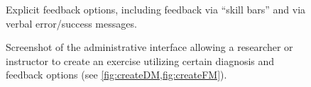 \documentclass[11pt,a4paper,onecolumn]{article}
\begin{document}
		\begin{figure}
		\centering
		\caption{Explicit feedback options, including feedback via ``skill bars'' and via verbal error/success messages.}
		\label{fig:explicitFB}
		\end{figure}
		
		\begin{figure}
		\caption{Screenshot of the administrative interface allowing a researcher or instructor to create an exercise utilizing certain diagnosis and feedback options (see \cref{fig:createDM,fig:createFM}).}
		\label{fig:admin}
		\end{figure}
\end{document}
